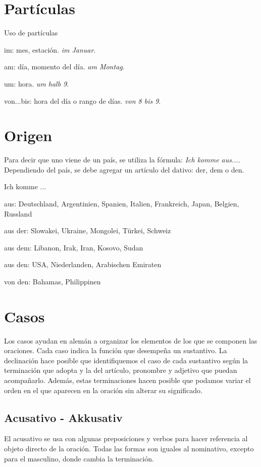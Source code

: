 \section{Partículas}
Uso de partículas
\begin{myitemize}
\item im: mes, estación. \textit{im Januar}.
\item am: día, momento del día. \textit{ am Montag}.
\item um: hora. \textit{um halb 9}.
\item von...bis: hora del día o rango de días. \textit{von 8 bis 9}.
\end{myitemize}

\section{Origen}
Para decir que uno viene de un país, se utiliza la fórmula: \textit{Ich komme aus...}. Dependiendo del país, se debe agregar un artículo del dativo: der, dem o den.

Ich komme ...
\begin{myitemize}
\item aus: Deutschland, Argentinien, Spanien, Italien, Frankreich, Japan, Belgien, Russland
\item aus der: Slowakei, Ukraine, Mongolei, Türkei, Schweiz
\item aus dem: Libanon, Irak, Iran, Kosovo, Sudan
\item aus den: USA, Niederlanden, Arabischen Emiraten
\item von den: Bahamas, Philippinen
\end{myitemize}


\section{Casos}
Los casos ayudan en alemán a organizar los elementos de los que se componen las oraciones. Cada caso indica la función que desempeña un sustantivo. La declinación hace posible que identifiquemos el caso de cada sustantivo según la terminación que adopta y la del artículo, pronombre y adjetivo que puedan acompañarlo. Además, estas terminaciones hacen posible que podamos variar el orden en el que aparecen en la oración sin alterar su significado.

\subsection{Acusativo - Akkusativ}
El acusativo se usa con algunas preposiciones y verbos para hacer referencia al objeto directo de la oración. Todas las formas son iguales al nominativo, excepto para el masculino, donde cambia la terminación. 

